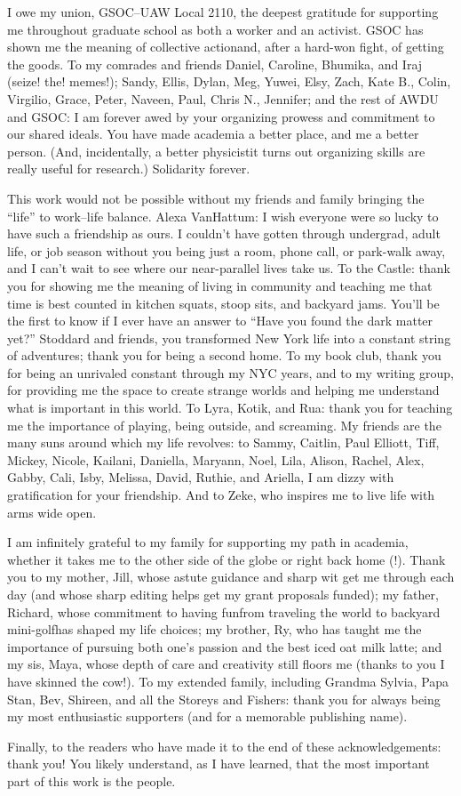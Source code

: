 I owe my union, GSOC--UAW Local 2110, the deepest gratitude for supporting me throughout graduate school as both a worker and an activist. 
GSOC has shown me the meaning of collective action{\emdash}and, after a hard-won fight, of getting the goods.
To my comrades and friends Daniel, Caroline, Bhumika, and Iraj (seize! the! memes!); Sandy, Ellis, Dylan, Meg, Yuwei, Elsy, Zach, Kate B., Colin, Virgilio, Grace, Peter, Naveen, Paul, Chris N., Jennifer; and the rest of AWDU and GSOC: I am forever awed by your organizing prowess and commitment to our shared ideals.
You have made academia a better place, and me a better person. 
(And, incidentally, a better physicist{\emdash}it turns out organizing skills are really useful for research.)
Solidarity forever.

This work would not be possible without my friends and family bringing the ``life'' to work--life balance.
Alexa VanHattum: I wish everyone were so lucky to have such a friendship as ours.
I couldn't have gotten through undergrad, adult life, or job season without you being just a room, phone call, or park-walk away, and I can't wait to see where our near-parallel lives take us.
To the Castle: thank you for showing me the meaning of living in community and teaching me that time is best counted in kitchen squats, stoop sits, and backyard jams.
You'll be the first to know if I ever have an answer to ``Have you found the dark matter yet?''
Stoddard and friends, you transformed New York life into a constant string of adventures; thank you for being a second home.
To my book club, thank you for being an unrivaled constant through my NYC years, and to my writing group, for providing me the space to create strange worlds and helping me understand what is important in this world.
To Lyra, Kotik, and Rua: thank you for teaching me the importance of playing, being outside, and screaming.
My friends are the many suns around which my life revolves: to Sammy, Caitlin, Paul Elliott, Tiff, Mickey, Nicole, Kailani, Daniella, Maryann, Noel, Lila, Alison, Rachel, Alex, Gabby, Cali, Isby, Melissa, David, Ruthie, and Ariella, I am dizzy with gratification for your friendship.
And to Zeke, who inspires me to live life with arms wide open.

I am infinitely grateful to my family for supporting my path in academia, whether it takes me to the other side of the globe or right back home (!).
Thank you to my mother, Jill, whose astute guidance and sharp wit get me through each day (and whose sharp editing helps get my grant proposals funded); my father, Richard, whose commitment to having fun{\emdash}from traveling the world to backyard mini-golf{\emdash}has shaped my life choices; my brother, Ry, who has taught me the importance of pursuing both one's passion and the best iced oat milk latte; and my sis, Maya, whose depth of care and creativity still floors me (thanks to you I have skinned the cow!).
To my extended family, including Grandma Sylvia, Papa Stan, Bev, Shireen, and all the Storeys and Fishers: thank you for always being my most enthusiastic supporters (and for a memorable publishing name).

Finally, to the readers who have made it to the end of these acknowledgements: thank you!
You likely understand, as I have learned, that the most important part of this work is the people.